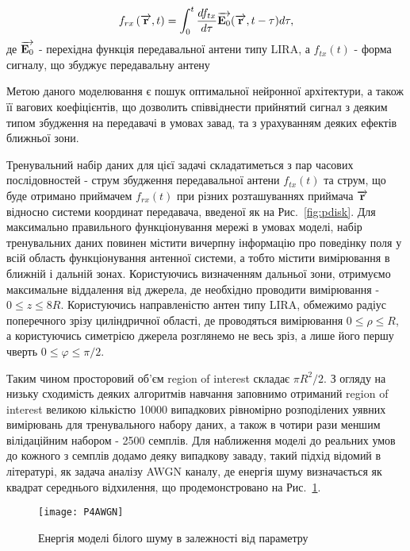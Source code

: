 \begin{equation}
f_{rx} \left( \overrightarrow{\mathbf r}, t \right) = 
\int_0^t \frac{d f_{tx}}{d \tau} \overrightarrow{\mathbf E_0} (\overrightarrow{\mathbf r}, t - \tau) d \tau,
\end{equation}
%
де $ \overrightarrow{\mathbf E_0} $ - перехідна функція передавальної антени типу LIRA, а 
$ f_{tx} (t) $ - форма сигналу, що збуджує передавальну антену

Метою даного моделювання є пошук оптимальної нейронної архітектури, а також 
її вагових коефіцієнтів, що дозволить співвіднести прийнятий сигнал 
 з деяким типом збудження на передавачі в умовах 
завад, та з урахуванням деяких ефектів ближньої зони.

Тренувальний набір даних для цієї задачі складатиметься з пар часових 
послідовностей - струм збудження передавальної антени $ f_{tx} (t) $ та струм, 
що буде отримано приймачем $ f_{rx} (t) $ при різних розташуваннях 
приймача $ \overrightarrow{\mathbf r} $ відносно системи координат передавача, введеної як на 
Рис.~\ref{fig:pdisk}. Для максимально правильного функціонування мережі в 
умовах моделі, набір тренувальних даних повинен містити вичерпну інформацію про 
поведінку поля у всій область функціонування антенної системи, а тобто містити 
вимірювання в ближній і дальній зонах. Користуючись визначенням дальньої зони,
отримуємо максимальне віддалення від джерела, де необхідно проводити 
вимірювання - $ 0 \leq z \leq 8R $. Користуючись направленістю антен типу 
LIRA, обмежимо радіус поперечного зрізу циліндричної області, де проводяться 
вимірювання $ 0 \leq \rho \leq R $, а користуючись симетрією джерела розглянемо 
не весь зріз, а лише його першу чверть $ 0 \leq \varphi \leq \pi / 2 $.

Таким чином просторовий об'єм region of interest складає $ \pi R^2 / 2 $. 
З огляду на низьку сходимість деяких алгоритмів навчання заповнимо 
отриманий region of interest великою кількістю 10000 випадкових рівномірно 
розподілених уявних вимірювань для тренувального набору даних, а також
в чотири рази меншим вілідаційним набором - 2500 семплів. Для наближення 
моделі до реальних умов до кожного з семплів додамо деяку випадкову заваду,
такий підхід відомий в літературі, як задача аналізу AWGN каналу, де енергія 
шуму визначається як квадрат середнього відхилення, що продемонстровано 
на Рис.~\ref{fig:P4AWGN}.

\begin{figure}[htbp] \begin{center}
\texttt{[image: P4AWGN]}
\caption{Енергія моделі білого шуму в залежності від параметру} \label{fig:P4AWGN}
\end{center} \end{figure}

